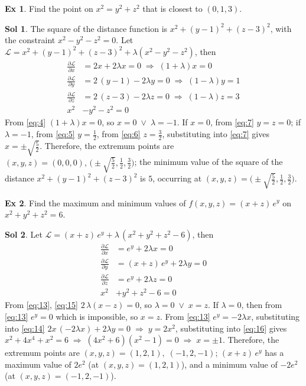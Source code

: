 \documentclass[12pt]{extarticle}
\newcommand{\ds}{\displaystyle}
\newcommand{\ie}{\;\Longrightarrow\;}
\newcommand{\orr}{\;\vee\;}
\theoremstyle{definition}
\newtheorem*{ex}{Ex}
\newtheorem*{sol}{Sol}
\newcommand{\pdiff}[2]{\frac{\partial #1}{\partial #2}}
\begin{document}
\begin{ex}
  Find the point on $x^2 = y^2 + z^2$ that is closest to $(0, 1, 3)$. 
\end{ex}

\begin{sol}
  The square of the distance function is $x^2 + (y - 1)^2 + (z - 3)^2$, with the constraint $x^2 - y^2 - z^2 = 0$. Let $\ds\mathcal{L} = x^2 + (y - 1)^2 + (z - 3)^2 + \lambda(x^2 - y^2 - z^2)$, then
  \begin{align}
    \pdiff{\mathcal{L}}{x} &= 2 x + 2\lambda x = 0\ie (1 + \lambda) x = 0 \label{eq:4}\\
    \pdiff{\mathcal{L}}{y} &= 2\,(y - 1) - 2\lambda y = 0\ie (1 - \lambda) y = 1 \label{eq:5} \\
    \pdiff{\mathcal{L}}{z} &= 2\,(z - 3) - 2\lambda z = 0\ie (1 - \lambda) z = 3 \label{eq:6} \\
    x^2 &- y^2 - z^2 = 0 \label{eq:7}
  \end{align}
  From \eqref{eq:4} $(1 + \lambda) x = 0$, so $x = 0\orr\lambda = -1$. If $x = 0$, from \eqref{eq:7} $y = z = 0$; if $\lambda = -1$, from \eqref{eq:5} $y = \frac{1}{2}$, from \eqref{eq:6} $z = \frac{3}{2}$, substituting into \eqref{eq:7} gives $x = \pm\sqrt{\frac{5}{2}}$. Therefore, the extremum points are $(x, y, z) = (0, 0, 0),\,\Big(\pm\sqrt{\frac{5}{2}}, \frac{1}{2}, \frac{3}{2}\Big)$; the minimum value of the square of the distance $x^2 + (y - 1)^2 + (z - 3)^2$ is $5$, occurring at $(x, y, z) = \Big(\pm\sqrt{\frac{5}{2}}, \frac{1}{2}, \frac{3}{2}\Big)$. 
\end{sol}

\begin{ex}
  Find the maximum and minimum values of $\ds f(x, y, z) = (x + z)\,e^y$ on $x^2 + y^2 + z^2 = 6$. 
\end{ex}
  
\begin{sol}
  Let $\ds\mathcal{L} = (x + z)\,e^y + \lambda\,(x^2 + y^2 + z^2 - 6)$, then 
  \begin{align}
    \pdiff{\mathcal{L}}{x} &= e^y + 2\lambda x = 0\label{eq:13}\\
    \pdiff{\mathcal{L}}{y} &= (x + z)\,e^y + 2\lambda y = 0\label{eq:14} \\
    \pdiff{\mathcal{L}}{z} &= e^y + 2\lambda z = 0\label{eq:15} \\
    x^2 &+ y^2 + z^2 - 6 = 0 \label{eq:16}
  \end{align}
  From \eqref{eq:13}, \eqref{eq:15} $2\,\lambda(x - z) = 0$, so $\lambda = 0\orr x = z$. If $\lambda = 0$, then from \eqref{eq:13} $\ds e^y = 0$ which is impossible, so $x = z$. From \eqref{eq:13} $e^y = -2\lambda x$, substituting into \eqref{eq:14} $2x\,(-2\lambda x) + 2\lambda y = 0\ie y = 2x^2$, substituting into \eqref{eq:16} gives $x^2 + 4x^4 + x^2 = 6\ie (4x^2 + 6)(x^2 - 1) = 0 \ie x = \pm 1$. Therefore, the extremum points are $(x, y, z) = (1, 2, 1),\;(-1, 2, -1)$; $(x + z)\,e^y$ has a maximum value of $2e^2$ (at $(x, y, z) = (1, 2, 1)$), and a minimum value of $-2e^2$ (at $(x, y, z) = (-1, 2, -1)$). 
\end{sol}
\end{document}
